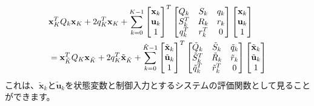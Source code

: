 \documentclass[a4paper]{jarticle}
\begin{document}
\begin{align}
 &\mathbf{x}_K^TQ_k\mathbf{x}_K+2q_K^T\mathbf{x}_{K}+
 \sum_{k=0}^{K-1}
\begin{bmatrix} \mathbf{x}_k \\ \mathbf{u}_k \\ 1\end{bmatrix}^T
\begin{bmatrix} Q_k & S_k & q_k \\ S_k^T & R_k & r_k \\ q_k^T & r_k^T & 0\end{bmatrix}
\begin{bmatrix} \mathbf{x}_k \\ \mathbf{u}_k \\ 1\end{bmatrix}
\notag
\\
 &=\mathbf{x}_{\tilde{K}}^TQ_K\mathbf{x}_{\tilde{K}}
 +2q_K^T\tilde{\mathbf{x}}_{\tilde{K}}
 +
 \sum_{k=0}^{\tilde{K}-1}
 \begin{bmatrix} \tilde{\mathbf{x}}_{k} \\ \tilde{\mathbf{u}}_{k} \\ 1\end{bmatrix}^T
 \begin{bmatrix} \tilde{Q}_{k} & \tilde{S}_{k} & \tilde{q}_{k} \\ \tilde{S}_{k}^T & \tilde{R}_{k} & \tilde{r}_{k} \\ \tilde{q}_{k}^T & \tilde{r}_{k}^T & 0\end{bmatrix}
 \begin{bmatrix} \tilde{\mathbf{x}}_{k} \\ \tilde{\mathbf{u}}_{k} \\ 1\end{bmatrix}
  \label{eq:partial_dense_obj_3}
\end{align}
これは、$\tilde{\mathbf{x}}_k$と$\tilde{\mathbf{u}}_k$を状態変数と制御入力とするシステムの評価関数として見ることができます。
\end{document}
